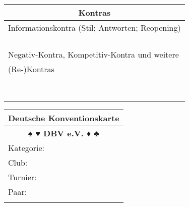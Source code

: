 \documentclass{article}
\begin{document}
\begin{multicols}{3}
\begin{tabular}{|l|l|l|}
\hline \multicolumn{3}{c}{\bf \large Kontras} \\
\hline \multicolumn{3}{|l|}{Informationskontra (Stil; Antworten; Reopening)} \\
       \multicolumn{3}{|l|}{} \\
       \multicolumn{3}{|l|}{} \\
       \multicolumn{3}{|l|}{} \\
       \multicolumn{3}{|l|}{} \\
\hline \multicolumn{3}{|l|}{Negativ-Kontra, Kompetitiv-Kontra und weitere} \\
       \multicolumn{3}{|l|}{(Re-)Kontras} \\
       \multicolumn{3}{|l|}{} \\
       \multicolumn{3}{|l|}{} \\
       \multicolumn{3}{|l|}{} \\
       \multicolumn{3}{|l|}{} \\
       \multicolumn{3}{|l|}{} \\
       \multicolumn{3}{|l|}{} \\
       \multicolumn{3}{|l|}{} \\
       \multicolumn{3}{|l|}{} \\
\hline \end{tabular}

\begin{tabular}{|l|}
\hline \multicolumn{1}{c}{\bf \Large Deutsche Konventionskarte} \\
\hline \multicolumn{1}{c}{\bf \Large ♠ ♥ DBV e.V. ♦ ♣} \\
\hline Kategorie: \\
\hline Club: \\
\hline Turnier: \\
\hline Paar: \\
\\


\end{tabular}
\end{multicols}
\end{document}
